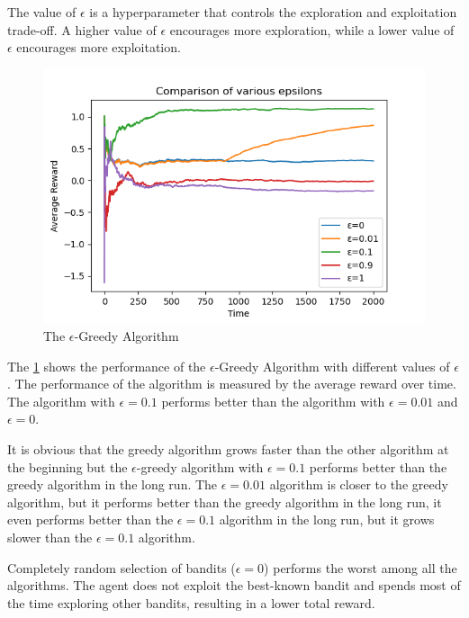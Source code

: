 The value of $\epsilon$ is a hyperparameter that controls the exploration and exploitation trade-off. A higher value of $\epsilon$ encourages more exploration, while a lower value of $\epsilon$ encourages more exploitation.

\begin{figure}[h!]
    \centering
    \includegraphics[width=0.75\linewidth]{images/compare-epsilon-greedy.png}
    \caption{The $\epsilon$-Greedy Algorithm}
    \label{fig:epsilon_greedy}
\end{figure}

The \ref{fig:epsilon_greedy} shows the performance of the $\epsilon$-Greedy Algorithm with different values of $\epsilon$. The performance of the algorithm is measured by the average reward over time. The algorithm with $\epsilon=0.1$ performs better than the algorithm with $\epsilon=0.01$ and $\epsilon=0$.

It is obvious that the greedy algorithm grows faster than the other algorithm at the beginning but the $\epsilon$-greedy algorithm with $\epsilon=0.1$ performs better than the greedy algorithm in the long run. The $\epsilon=0.01$ algorithm is closer to the greedy algorithm, but it performs better than the greedy algorithm in the long run, it even performs better than the $\epsilon=0.1$ algorithm in the long run, but it grows slower than the $\epsilon=0.1$ algorithm.

Completely random selection of bandits ($\epsilon=0$) performs the worst among all the algorithms. The agent does not exploit the best-known bandit and spends most of the time exploring other bandits, resulting in a lower total reward.

